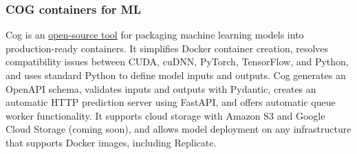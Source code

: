 \subsubsection{COG containers for ML}
Cog is an \href{https://github.com/replicate/cog}{open-source tool} for packaging machine learning models into production-ready containers. It simplifies Docker container creation, resolves compatibility issues between CUDA, cuDNN, PyTorch, TensorFlow, and Python, and uses standard Python to define model inputs and outputs. Cog generates an OpenAPI schema, validates inputs and outputs with Pydantic, creates an automatic HTTP prediction server using FastAPI, and offers automatic queue worker functionality. It supports cloud storage with Amazon S3 and Google Cloud Storage (coming soon), and allows model deployment on any infrastructure that supports Docker images, including Replicate.
